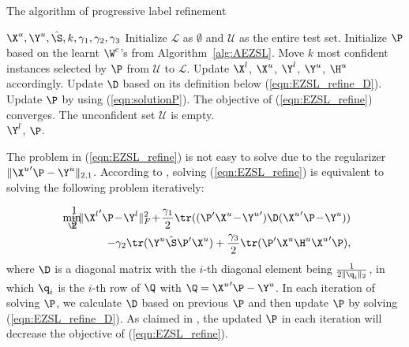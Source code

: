 \documentclass[journal]{IEEEtran}
\begin{document}
\setlength{\textfloatsep}{3pt}
\begin{algorithm}[t]
   \caption{The algorithm of progressive label refinement}
   \label{alg:PRZSL}
\begin{algorithmic}[1]
    $\X^u, \Y^u, \hat{\S}, k, \gamma_1, \gamma_2, \gamma_3$
   \STATE Initialize $\mathcal{L}$ as $\emptyset$ and $\mathcal{U}$ as the entire test set. Initialize $\P$ based on the learnt $\W^c$'s from Algorithm~\ref{alg:AEZSL}.
   \REPEAT
      \STATE Move $k$ most confident instances selected by $\P$ from $\mathcal{U}$ to $\mathcal{L}$. Update $\X^l$, $\X^u$, $\Y^l$, $\Y^u$, $\H^u$ accordingly.
   	  \REPEAT
   	  \STATE Update $\D$ based on its definition below (\ref{eqn:EZSL_refine_D}).
      \STATE Update $\P$ by using (\ref{eqn:solutionP}).      
      \UNTIL The objective of (\ref{eqn:EZSL_refine}) converges.
   \UNTIL The unconfident set $\mathcal{U}$ is empty. \\        
    $\Y^l$, $\P$.
\end{algorithmic}
\label{alg:RKLRR}
\end{algorithm}

The problem in (\ref{eqn:EZSL_refine}) is not easy to solve due to the regularizer $\|{\X^u}'\P-\Y^u\|_{2,1}$. According to \cite{nie2010efficient}, solving (\ref{eqn:EZSL_refine}) is equivalent to solving the following problem iteratively:

\vspace{-15pt}
\begin{eqnarray} \label{eqn:EZSL_refine_D}
\min_{\P} \!\!\!\!\!\!\!\!\!\!\!\!&&\frac{1}{2}\|{\X^l}'\P\!-\!\Y^l\|_F^2 \!+\!\frac{\gamma_1}{2}\tr((\P'\X^u\!-\!{\Y^u}')\D({\X^u}'\P\!-\!\Y^u))\nonumber\\
&&-\gamma_2\tr(\Y^u\hat{\S}\P'\X^u)+\frac{\gamma_3}{2}\tr(\P'\X^u\H^u{\X^u}'\P),
\end{eqnarray}
\noindent where $\D$ is a diagonal matrix with the $i$-th diagonal element being $\frac{1}{2\|\q_i\|_2}$, in which $\q_i$ is the $i$-th row of $\Q$ with $\Q={\X^u}'\P-\Y^u$. In each iteration of solving $\P$, we calculate $\D$ based on previous $\P$ and then update $\P$ by solving (\ref{eqn:EZSL_refine_D}). As claimed in \cite{nie2010efficient}, the updated $\P$ in each iteration will decrease the objective of (\ref{eqn:EZSL_refine}).
\end{document}
